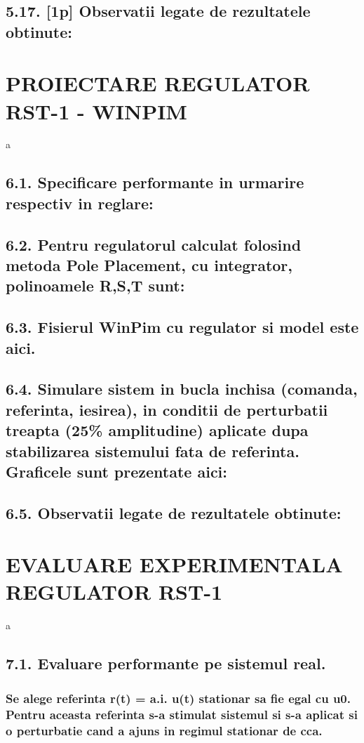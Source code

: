\documentclass[12pt,english]{article}
\begin{document}
\subsection {5.17. [1p] Observatii legate de rezultatele obtinute: }

\section {PROIECTARE REGULATOR RST-1 - WINPIM }
a
\subsection {6.1. Specificare performante in urmarire respectiv in reglare: }
\subsection {6.2. Pentru regulatorul calculat folosind metoda Pole Placement, cu integrator, polinoamele R,S,T sunt: }
\subsection {6.3. Fisierul WinPim cu regulator si model este aici. }
\subsection {6.4. Simulare sistem in bucla inchisa (comanda, referinta, iesirea), in conditii de perturbatii treapta (25\% amplitudine) aplicate dupa stabilizarea sistemului fata de referinta. Graficele sunt prezentate aici: }
\subsection {6.5. Observatii legate de rezultatele obtinute: }

\section {EVALUARE EXPERIMENTALA REGULATOR RST-1 }
a
\subsection {7.1. Evaluare performante pe sistemul real. }
\subsubsection {Se alege referinta r(t) = a.i. u(t) stationar sa fie egal cu u0. Pentru aceasta referinta s-a stimulat sistemul si s-a aplicat si o perturbatie cand a ajuns in regimul stationar de cca.}
\end{document}
